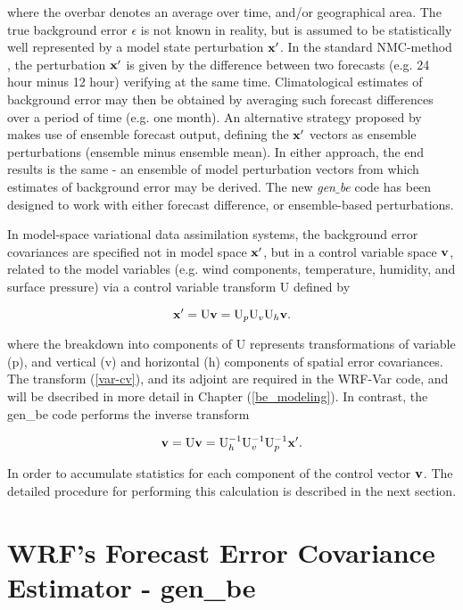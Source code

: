 \noindent where the overbar denotes an average over time, and/or geographical area. The true background error $\epsilon$ is not known in reality, but is assumed to be statistically well represented by a model state perturbation ${\bf x'}$. In the standard NMC-method \citep{parrish92}, the perturbation ${\bf x'}$ is given by the difference between two forecasts (e.g. 24 hour minus 12 hour) verifying at the same time. Climatological estimates of background error may then be obtained by averaging such forecast differences over a period of time (e.g. one month). An alternative strategy proposed by \citep{fisher03} makes use of ensemble forecast output, defining the ${\bf x'}$ vectors as ensemble perturbations (ensemble minus ensemble mean). In either approach, the end results is the same  - an ensemble of model perturbation vectors from which estimates of background error may be derived. The new {\it gen$\_$be} code has been designed to work with either forecast difference, or ensemble-based perturbations.

In model-space variational data assimilation systems, the background error covariances are specified not in model space ${\bf x'}$, but in a control variable space ${\bf v}$, related to the model variables (e.g. wind components, temperature, humidity, and surface pressure) via a control variable transform U defined by

\begin{equation}
{\bf x'} = {\rm U}{\bf v}= {\rm U}_{p} {\rm U}_{v} {\rm U}_{h}{\bf v}.
\label{var-cv}
\end{equation}

where the breakdown into components of U represents transformations of variable (p), and vertical (v) and horizontal (h) components of spatial error covariances. The transform (\ref{var-cv}), and its adjoint are required in the WRF-Var code, and will be dsecribed in more detail in Chapter (\ref{be_modeling}). In contrast, the gen\_be code performs the inverse transform

\begin{equation}
{\bf v} = {\rm U}{\bf v}= {\rm U}^{-1}_{h} {\rm U}^{-1}_{v} {\rm U}^{-1}_{p} {\bf x'}.
\label{var-cv-inv}
\end{equation}

In order to accumulate statistics for each component of the control vector $\bf v$. The detailed procedure for performing this calculation is described in the next section.


\section{WRF's Forecast Error Covariance Estimator - gen\_be}
\label{gen_be_sub}

